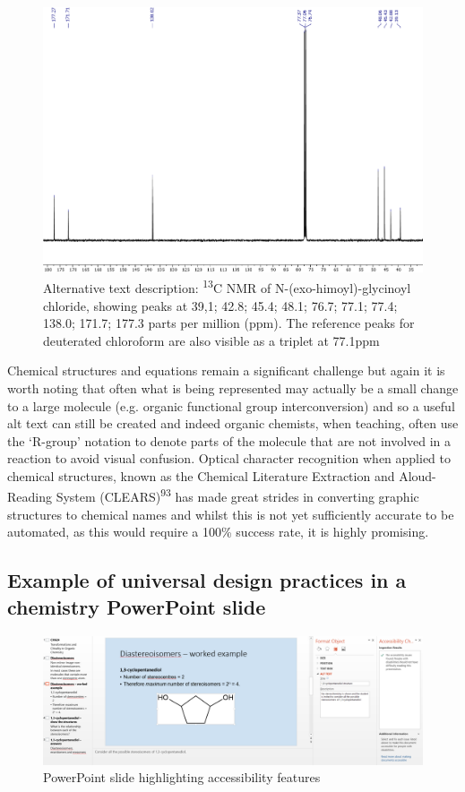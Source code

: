 \documentclass[11.5pt]{sig-alternate} %
\begin{document}
\begin{large}
\begin{figure}[htb]
    \centering
    \includegraphics[width=\columnwidth]{images/fig2.png}
    \caption{Alternative text description: \textsuperscript{13}C NMR of N-(exo-himoyl)-glycinoyl chloride, showing peaks at 39,1; 42.8; 45.4; 48.1; 76.7; 77.1; 77.4; 138.0; 171.7; 177.3 parts per million (ppm). The reference peaks for deuterated chloroform are also visible as a triplet at 77.1ppm}
    \label{Figure 2}
\end{figure}

Chemical structures and equations remain a significant challenge but again it is worth noting that often what is being represented may actually be a small change to a large molecule (e.g. organic functional group interconversion) and so a useful alt text can still be created and indeed organic chemists, when teaching, often use the ‘R-group’ notation to denote parts of the molecule that are not involved in a reaction to avoid visual confusion. Optical character recognition when applied to chemical structures, known as the Chemical Literature Extraction and Aloud-Reading System (CLEARS)\textsuperscript{93} has made great strides in converting graphic structures to chemical names and whilst this is not yet sufficiently accurate to be automated, as this would require a 100\% success rate, it is highly promising. 

\subsection*{Example of universal design practices in a chemistry PowerPoint slide}

\begin{figure}[htb]
    \centering
    \includegraphics[width=\textwidth]{images/fig3.png}
    \caption{PowerPoint slide highlighting accessibility features}
    \label{Figure 3}
\end{figure}


\end{large}
\end{document}
